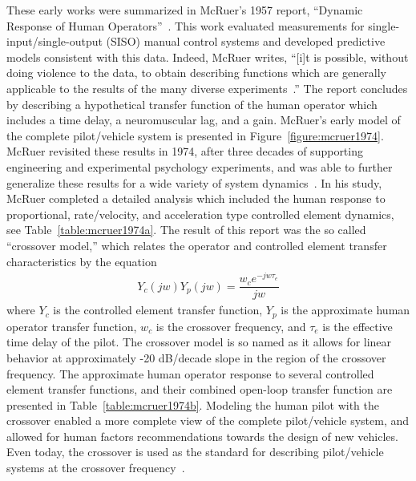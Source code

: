 \documentclass[float=false, crop=false]{standalone}
\begin{document}
These early works were summarized in McRuer's 1957 report, ``Dynamic Response of Human Operators''~\cite{McRuer1957}.
This work evaluated measurements for single-input/single-output (SISO) manual control systems and developed predictive models consistent with this data.
Indeed, McRuer writes, ``[i]t is possible, without doing violence to the data, to obtain describing functions which are generally applicable to the results of the many diverse experiments~\cite{McRuer1957}.''
The report concludes by describing a hypothetical transfer function of the human operator which includes a time delay, a neuromuscular lag, and a gain.
McRuer's early model of the complete pilot/vehicle system is presented in Figure~\ref{figure:mcruer1974}.
McRuer revisited these results in 1974, after three decades of supporting engineering and experimental psychology experiments, and was able to further generalize these results for a wide variety of system dynamics~\cite{McRuer1974}.
In his study, McRuer completed a detailed analysis which included the human response to proportional, rate/velocity, and acceleration type controlled element dynamics, see Table~\ref{table:mcruer1974a}.
The result of this report was the so called ``crossover model,'' which relates the operator and controlled element transfer characteristics by the equation
\begin{align*}
Y_c(jw) Y_p(jw) = \dfrac{w_c e^{-jw \tau_e}}{jw}
\end{align*}
where $Y_c$ is the controlled element transfer function, $Y_p$ is the approximate human operator transfer function, $w_c$ is the crossover frequency, and $\tau_e$ is the effective time delay of the pilot.
The crossover model is so named as it allows for linear behavior at approximately -20 dB/decade slope in the region of the crossover frequency.
The approximate human operator response to several controlled element transfer functions, and their combined open-loop transfer function are presented in Table~\ref{table:mcruer1974b}.
Modeling the human pilot with the crossover enabled a more complete view of the complete pilot/vehicle system, and allowed for human factors recommendations towards the design of new vehicles.
Even today, the crossover is used as the standard for describing pilot/vehicle systems at the crossover frequency~\cite{McRuer1965, McRuer1974, Xu2017}.
\end{document}
